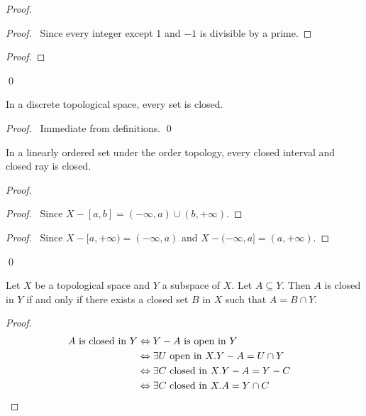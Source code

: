 \begin{proof}
\begin{proof}
	\pf\ Since every integer except 1 and $-1$ is divisible by a prime.
\end{proof}
\begin{proof}
\end{proof}
\qed
\end{proof}

\begin{prop}
In a discrete topological space, every set is closed.
\end{prop}

\begin{proof}
\pf\ Immediate from definitions. \qed
\end{proof}

\begin{prop}
In a linearly ordered set under the order topology, every closed interval and closed ray is closed.
\end{prop}

\begin{proof}
\pf
{}
\begin{proof}
	\pf\ Since $X - [a,b] = (-\infty, a) \cup (b, +\infty)$.
\end{proof}
\begin{proof}
	\pf\ Since $X - [a,+\infty) = (-\infty,a)$ and $X - (-\infty,a] = (a,+\infty)$.
\end{proof}
\qed
\end{proof}

\begin{prop}
Let $X$ be a topological space and $Y$ a subspace of $X$. Let $A \subseteq Y$. Then $A$ is closed in $Y$ if and only if there exists a closed set $B$ in $X$ such that $A = B \cap Y$.
\end{prop}

\begin{proof}
\pf
\begin{align*}
A \text{ is closed in } Y & \Leftrightarrow Y - A \text{ is open in } Y \\
& \Leftrightarrow \exists U \text{ open in } X. Y - A = U \cap Y \\
& \Leftrightarrow \exists C \text{ closed in } X. Y - A = Y - C \\
& \Leftrightarrow \exists C \text{ closed in } X. A = Y \cap C & \qed
\end{align*}
\end{proof}

